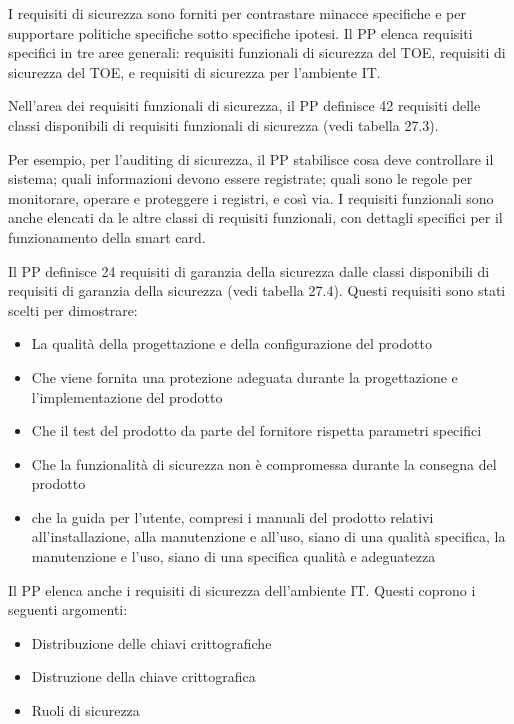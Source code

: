 I requisiti di sicurezza sono forniti per contrastare minacce specifiche e per supportare politiche specifiche sotto specifiche ipotesi. Il PP elenca requisiti specifici in tre aree generali: requisiti funzionali di sicurezza del TOE, requisiti di sicurezza del TOE, e requisiti di sicurezza per l'ambiente IT.

\singlespacing

Nell'area dei requisiti funzionali di sicurezza, il PP definisce 42 requisiti delle classi disponibili di requisiti funzionali di sicurezza (vedi tabella 27.3).

\singlespacing

Per esempio, per l'auditing di sicurezza, il PP stabilisce cosa deve controllare il sistema; quali informazioni devono essere registrate; quali sono le regole per monitorare, operare e proteggere i registri, e così via. I requisiti funzionali sono anche elencati da le altre classi di requisiti funzionali, con dettagli specifici per il funzionamento della smart card.

\singlespacing

Il PP definisce 24 requisiti di garanzia della sicurezza dalle classi disponibili di requisiti di garanzia della sicurezza (vedi tabella 27.4). Questi requisiti sono stati scelti per dimostrare:

\begin{itemize}
    \item La qualità della progettazione e della configurazione del prodotto
    
    \item Che viene fornita una protezione adeguata durante la progettazione e l'implementazione del prodotto
    
    \item  Che il test del prodotto da parte del fornitore rispetta parametri specifici
    
    \item Che la funzionalità di sicurezza non è compromessa durante la consegna del prodotto
    
    \item che la guida per l'utente, compresi i manuali del prodotto relativi all'installazione, alla manutenzione e all'uso, siano di una qualità specifica, la manutenzione e l'uso, siano di una specifica qualità e adeguatezza
\end{itemize}
Il PP elenca anche i requisiti di sicurezza dell'ambiente IT. Questi coprono i seguenti argomenti:

\begin{itemize}
    \item Distribuzione delle chiavi crittografiche
    
    \item Distruzione della chiave crittografica
    
    \item Ruoli di sicurezza
\end{itemize}

